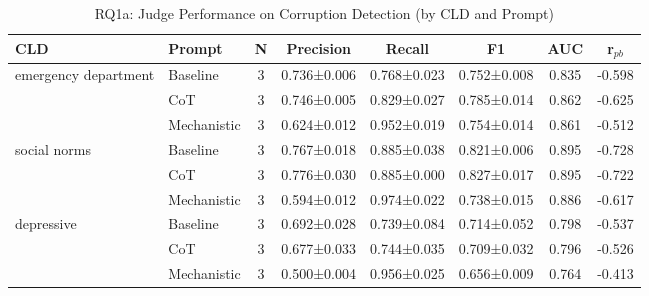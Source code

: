 \begin{table}[htbp]
\centering
\caption{RQ1a: Judge Performance on Corruption Detection (by CLD and Prompt)}
\label{tab:rq1a_main}
\begin{tabular}{llcccccc}
\toprule
\textbf{CLD} & \textbf{Prompt} & \textbf{N} & \textbf{Precision} & \textbf{Recall} & \textbf{F1} & \textbf{AUC} & \textbf{r$_{pb}$} \\
\midrule
emergency department & Baseline & 3 & 0.736±0.006 & 0.768±0.023 & 0.752±0.008 & 0.835 & -0.598 \\
 & CoT & 3 & 0.746±0.005 & 0.829±0.027 & 0.785±0.014 & 0.862 & -0.625 \\
 & Mechanistic & 3 & 0.624±0.012 & 0.952±0.019 & 0.754±0.014 & 0.861 & -0.512 \\
\midrule
social norms & Baseline & 3 & 0.767±0.018 & 0.885±0.038 & 0.821±0.006 & 0.895 & -0.728 \\
 & CoT & 3 & 0.776±0.030 & 0.885±0.000 & 0.827±0.017 & 0.895 & -0.722 \\
 & Mechanistic & 3 & 0.594±0.012 & 0.974±0.022 & 0.738±0.015 & 0.886 & -0.617 \\
\midrule
depressive & Baseline & 3 & 0.692±0.028 & 0.739±0.084 & 0.714±0.052 & 0.798 & -0.537 \\
 & CoT & 3 & 0.677±0.033 & 0.744±0.035 & 0.709±0.032 & 0.796 & -0.526 \\
 & Mechanistic & 3 & 0.500±0.004 & 0.956±0.025 & 0.656±0.009 & 0.764 & -0.413 \\
\midrule
\bottomrule
\end{tabular}
\end{table}